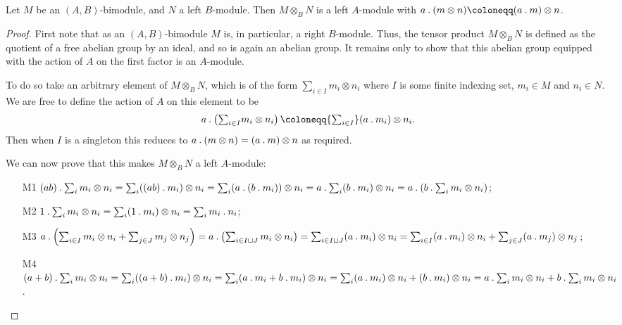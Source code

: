 \begin{lma}{}{}
    Let \(M\) be an \((A, B)\)-bimodule, and \(N\) a left \(B\)-module.
    Then \(M \otimes_B N\) is a left \(A\)-module with \(a \action (m \otimes n) \coloneqq (a \action m) \otimes n\).
    \begin{proof}
        First note that as an \((A, B)\)-bimodule \(M\) is, in particular, a right \(B\)-module.
        Thus, the tensor product \(M \otimes_B N\) is defined as the quotient of a free abelian group by an ideal, and so is again an abelian group.
        It remains only to show that this abelian group equipped with the action of \(A\) on the first factor is an \(A\)-module.
        
        To do so take an arbitrary element of \(M \otimes_B N\), which is of the form \(\sum_{i \in I} m_i \otimes n_i\) where \(I\) is some finite indexing set, \(m_i \in M\) and \(n_i \in N\).
        We are free to define the action of \(A\) on this element to be
        \begin{equation}
            a \action \left( {\textstyle \sum_{i \in I}} m_i \otimes n_i \right) \coloneqq {\textstyle \sum_{i \in I}} (a \action m_i) \otimes n_i.
        \end{equation}
        Then when \(I\) is a singleton this reduces to \(a \mathbin{.} (m \otimes n) = (a \mathbin{.} m) \otimes n\) as required.
        
        We can now prove that this makes \(M \otimes_B N\) a left \(A\)-module:
        \begin{itemize}
            \item[M1] \((ab) \mathbin{.} \sum_{i} m_i \otimes n_i = \sum_{i} ((ab) \mathbin{.} m_i) \otimes n_i = \sum_{i} (a \mathbin{.} (b \mathbin{.} m_i)) \otimes n_i = a \mathbin{.} \sum_i (b \mathbin{.} m_i) \otimes n_i = a \mathbin{.} \left( b \mathbin{.} \sum_i m_i \otimes n_i \right)\);
            \item[M2] \(1 \mathbin{.} \sum_i m_i \otimes n_i = \sum_i (1 \mathbin{.} m_i) \otimes n_i = \sum_i m_i \mathbin{.} n_i\);
            \item[M3] \(a \mathbin{.} \left( \sum_{i \in I} m_i \otimes n_i + \sum_{j \in J} m_j \otimes n_j \right) = a \mathbin{.} \left( \sum_{i \in I \sqcup J} m_i \otimes n_i \right) = \sum_{i \in I \sqcup J} (a \mathbin{.} m_i) \otimes n_i = \sum_{i \in I} (a \mathbin{.} m_i) \otimes n_i + \sum_{j \in J} (a \mathbin{.} m_j) \otimes n_j\);
            \item[M4] \((a + b) \mathbin{.} \sum_i m_i \otimes n_i = \sum_i ((a + b) \mathbin{.} m_i) \otimes n_i = \sum_i (a \mathbin{.} m_i + b \mathbin{.} m_i) \otimes n_i = \sum_i (a \mathbin{.} m_i) \otimes n_i + (b \mathbin{.} m_i) \otimes n_i = a \mathbin{.} \sum_i m_i \otimes n_i + b \mathbin{.} \sum_i m_i \otimes n_i\). 
        \end{itemize}
    \end{proof}
\end{lma}

